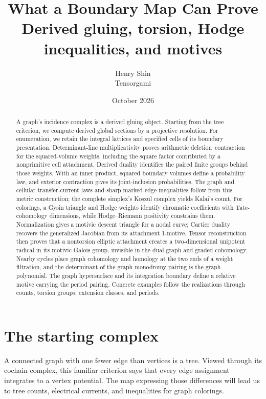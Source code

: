 \documentclass[11pt]{article}
\title{\textbf{What a Boundary Map Can Prove}\\[6pt]\large Derived gluing, torsion, Hodge inequalities, and motives}
\author{Henry Shin\\\small Tensorgami}
\date{\small October 2026}
\theoremstyle{definition}
\theoremstyle{remark}
\begin{document}
\maketitle\thispagestyle{empty}
\begin{abstract}
A graph's incidence complex is a derived gluing object. Starting from the tree criterion, we compute derived global sections by a projective resolution. For enumeration, we retain the integral lattices and specified cells of its boundary presentation. Determinant-line multiplicativity proves arithmetic deletion--contraction for the squared-volume weights, including the square factor contributed by a nonprimitive cell attachment. Derived duality identifies the paired finite groups behind those weights. With an inner product, squared boundary volumes define a probability law, and exterior contraction gives its joint-inclusion probabilities. The graph and cellular transfer-current laws and sharp marked-edge inequalities follow from this metric construction; the complete simplex's Koszul complex yields Kalai's count. For colorings, a Gysin triangle and Hodge weights identify chromatic coefficients with Tate-cohomology dimensions, while Hodge--Riemann positivity constrains them. Normalization gives a motivic descent triangle for a nodal curve; Cartier duality recovers the generalized Jacobian from its attachment 1-motive. Tensor reconstruction then proves that a nontorsion elliptic attachment creates a two-dimensional unipotent radical in its motivic Galois group, invisible in the dual graph and graded cohomology. Nearby cycles place graph cohomology and homology at the two ends of a weight filtration, and the determinant of the graph monodromy pairing is the graph polynomial. The graph hypersurface and its integration boundary define a relative motive carrying the period pairing. Concrete examples follow the realizations through counts, torsion groups, extension classes, and periods.
\end{abstract}
\clearpage
\begingroup\setlength{\parskip}{0pt}\fontsize{10}{12}\selectfont\tableofcontents\endgroup
\clearpage


\section{The starting complex}
\label{sec:tree}

A connected graph with one fewer edge than vertices is a tree. Viewed through its cochain complex, this familiar criterion says that every edge assignment integrates to a vertex potential. The map expressing those differences will lead us to tree counts, electrical currents, and inequalities for graph colorings.
\end{document}
